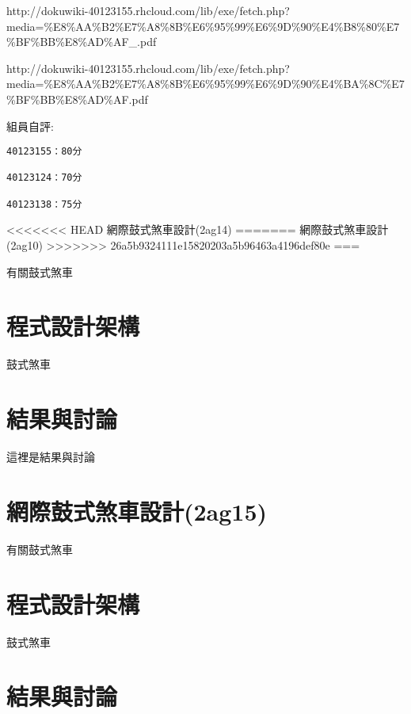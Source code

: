 \documentclass[]{article}
\begin{document}
http://dokuwiki-40123155.rhcloud.com/lib/exe/fetch.php?media=\%E8\%AA\%B2\%E7\%A8\%8B\%E6\%95\%99\%E6\%9D\%90\%E4\%B8\%80\%E7\%BF\%BB\%E8\%AD\%AF\_.pdf

http://dokuwiki-40123155.rhcloud.com/lib/exe/fetch.php?media=\%E8\%AA\%B2\%E7\%A8\%8B\%E6\%95\%99\%E6\%9D\%90\%E4\%BA\%8C\%E7\%BF\%BB\%E8\%AD\%AF.pdf

組員自評:

\begin{verbatim}
40123155：80分

40123124：70分

40123138：75分
\end{verbatim}

\textless{}\textless{}\textless{}\textless{}\textless{}\textless{}\textless{}
HEAD 網際鼓式煞車設計(2ag14) ======= 網際鼓式煞車設計(2ag10)
\textgreater{}\textgreater{}\textgreater{}\textgreater{}\textgreater{}\textgreater{}\textgreater{}
26a5b9324111e15820203a5b96463a4196def80e ===

有關鼓式煞車

\section{程式設計架構}\label{ux7a0bux5f0fux8a2dux8a08ux67b6ux69cb-8}

鼓式煞車

\section{結果與討論}\label{ux7d50ux679cux8207ux8a0eux8ad6-8}

這裡是結果與討論

\section{網際鼓式煞車設計(2ag15)}\label{ux7db2ux969bux9f13ux5f0fux715eux8ecaux8a2dux8a082ag15}

有關鼓式煞車

\section{程式設計架構}\label{ux7a0bux5f0fux8a2dux8a08ux67b6ux69cb-9}

鼓式煞車

\section{結果與討論}\label{ux7d50ux679cux8207ux8a0eux8ad6-9}
\end{document}

